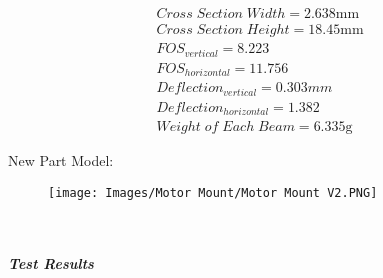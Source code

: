 \documentclass[12pt,letterpaper]{article}
\begin{document}
\begin{gather*}
Cross\;Section\;Width = 2.638\unit{\mm}\\
Cross\;Section\;Height = 18.45\unit{\mm}\\
FOS_{vertical} = 8.223\\
FOS_{horizontal} = 11.756\\
Deflection_{vertical} = 0.303\unit{mm}\\
Deflection_{horizontal} = 1.382\\
Weight\;of\;Each\;Beam = 6.335\unit{\g}
\end{gather*}

New Part Model:
\begin{figure}[h]
    \centering
    \texttt{[image: Images/Motor Mount/Motor Mount V2.PNG]}
    \caption{}
    \label{fig:my_label}
\end{figure}\\

\subparagraph{Test Results}
\end{document}

